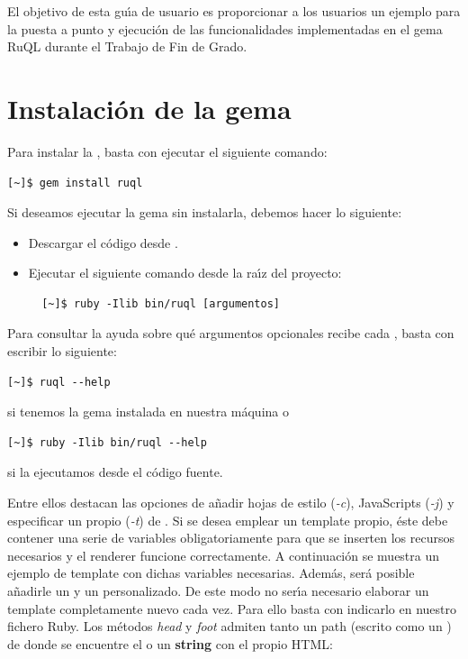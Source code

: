 El objetivo de esta gu\'{\i}a de usuario es proporcionar a los usuarios un ejemplo para la puesta a punto y ejecuci\'on de las 
funcionalidades implementadas en el gema RuQL durante el Trabajo de Fin de Grado.

\section{Instalaci\'on de la gema}
\label{Apendice2:instalacion}

Para instalar la , basta con ejecutar el siguiente comando:
\begin{verbatim}
[~]$ gem install ruql
\end{verbatim}

Si deseamos ejecutar la gema sin instalarla, debemos hacer lo siguiente:
\begin{itemize}
  \item Descargar el c\'odigo desde .
  \item Ejecutar el siguiente comando desde la ra\'{\i}z del proyecto:
  \begin{verbatim}
  [~]$ ruby -Ilib bin/ruql [argumentos]
  \end{verbatim}
\end{itemize}


Para consultar la ayuda sobre qu\'e argumentos opcionales recibe cada , basta con escribir lo siguiente:
\begin{verbatim}
[~]$ ruql --help
\end{verbatim}
si tenemos la gema instalada en nuestra m\'aquina o
\begin{verbatim}
[~]$ ruby -Ilib bin/ruql --help
\end{verbatim}
si la ejecutamos desde el c\'odigo fuente.

Entre ellos destacan las opciones de a\~{n}adir hojas de estilo (\textit{-c}), JavaScripts (\textit{-j}) y especificar un propio  (\textit{-t}) de .
Si se desea emplear un template propio, \'este debe contener una serie de variables obligatoriamente para que se inserten los recursos necesarios y el renderer funcione
correctamente. A continuaci\'on se muestra un ejemplo de template con dichas variables necesarias. Adem\'as, ser\'a posible a\~{n}adirle un  y un  personalizado. 
De este modo no ser\'{\i}a necesario elaborar un template completamente nuevo cada vez. Para ello basta con indicarlo en nuestro fichero Ruby. Los m\'etodos \textit{head} y
\textit{foot} admiten tanto un path (escrito como un ) de donde se encuentre el   o un {\bfseries string} con el propio HTML:

